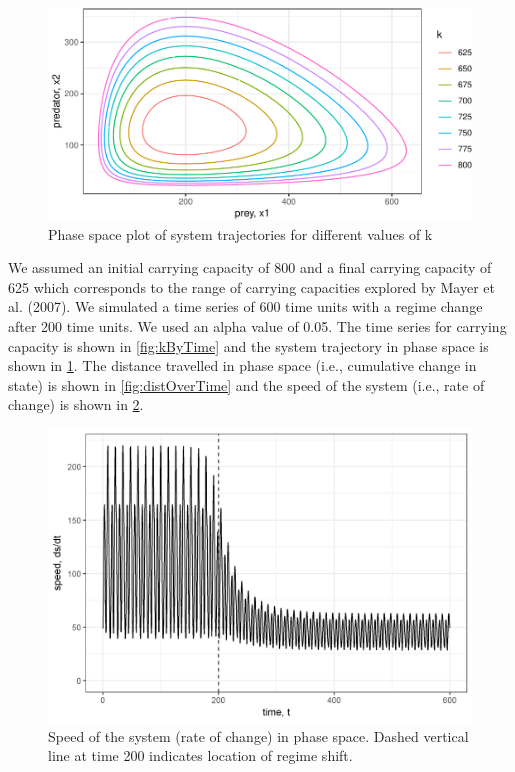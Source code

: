 \documentclass[12pt,twoside,openany]{reedthesis}
\begin{document}
\begin{figure}
\centering
\includegraphics{_myDissertation_files/figure-latex/kTrajectories-1.pdf}
\caption{\label{fig:kTrajectories}Phase space plot of system trajectories
for different values of k}
\end{figure}
We assumed an initial carrying capacity of 800 and a final carrying
capacity of 625 which corresponds to the range of carrying capacities
explored by Mayer et al. (2007). We simulated a time series of 600 time
units with a regime change after 200 time units. We used an alpha value
of 0.05. The time series for carrying capacity is shown in
\ref{fig:kByTime} and the system trajectory in phase space is shown in
\ref{fig:kTrajectories}. The distance travelled in phase space (i.e.,
cumulative change in state) is shown in \ref{fig:distOverTime} and the
speed of the system (i.e., rate of change) is shown in
\ref{fig:dsdtOverTime}.
\begin{figure}
\includegraphics[width=27.08in]{./chapterFiles/fiGuide/figures/dsdtOverTime} \caption{Speed of the system (rate of change) in phase space. Dashed vertical line at time 200 indicates location of regime shift.}\label{fig:dsdtOverTime}
\end{figure}
\end{document}
